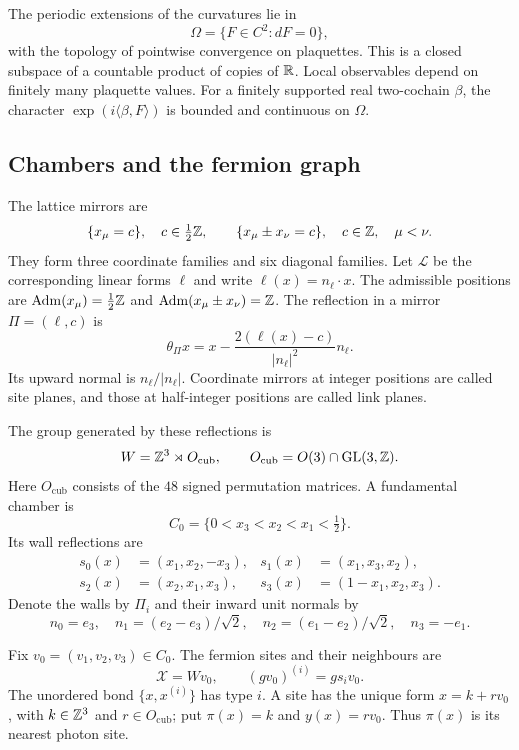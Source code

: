 The periodic extensions of the curvatures lie in
\[
 \Omega=\{F\in C^2:dF=0\},
\]
with the topology of pointwise convergence on plaquettes. This is a
closed subspace of a countable product of copies of $\mathbb R$. Local
observables depend on finitely many plaquette values. For a finitely
supported real two-cochain $\beta$, the character
$\exp(i\langle\beta,F\rangle)$ is bounded and continuous on $\Omega$.

\subsection{Chambers and the fermion graph}\label{subsec:reg-chambers}

The lattice mirrors are
\begin{equation}\label{eq:reg-mirrors}
 \{x_\mu=c\},\quad c\in\tfrac12\mathbb Z,
 \qquad
 \{x_\mu\pm x_\nu=c\},\quad c\in\mathbb Z,\quad\mu<\nu.
\end{equation}
They form three coordinate families and six diagonal families. Let
$\mathcal L$ be the corresponding linear forms $\ell$ and write
$\ell(x)=n_\ell\cdot x$. The admissible positions are
$\operatorname{Adm}(x_\mu)=\frac12\mathbb Z$ and
$\operatorname{Adm}(x_\mu\pm x_\nu)=\mathbb Z$. The reflection in a mirror
$\Pi=(\ell,c)$ is
\begin{equation}\label{eq:reg-reflection}
 \theta_\Pi x=x-\frac{2(\ell(x)-c)}{|n_\ell|^2}n_\ell.
\end{equation}
Its upward normal is $n_\ell/|n_\ell|$. Coordinate mirrors at integer
positions are called site planes, and those at half-integer positions
are called link planes.

The group generated by these reflections is
\[
 W=\mathbb Z^3\rtimes O_{\mathrm{cub}},
 \qquad O_{\mathrm{cub}}=O(3)\cap\operatorname{GL}(3,\mathbb Z).
\]
Here $O_{\mathrm{cub}}$ consists of the $48$ signed permutation matrices.
A fundamental chamber is
\[
 C_0=\{0<x_3<x_2<x_1<\tfrac12\}.
\]
Its wall reflections are
\begin{align*}
 s_0(x)&=(x_1,x_2,-x_3),&
 s_1(x)&=(x_1,x_3,x_2),\\
 s_2(x)&=(x_2,x_1,x_3),&
 s_3(x)&=(1-x_1,x_2,x_3).
\end{align*}
Denote the walls by $\Pi_i$ and their inward unit normals by
\begin{equation}\label{eq:reg-wall-normals}
 n_0=e_3,\quad n_1=(e_2-e_3)/\sqrt2,
 \quad n_2=(e_1-e_2)/\sqrt2,\quad n_3=-e_1.
\end{equation}

Fix $v_0=(v_1,v_2,v_3)\in C_0$. The fermion sites and their neighbours
are
\begin{equation}\label{eq:reg-fermion-sites}
 \mathcal X=Wv_0,\qquad (gv_0)^{(i)}=gs_iv_0.
\end{equation}
The unordered bond $\{x,x^{(i)}\}$ has type $i$. A site has the unique
form $x=k+rv_0$, with $k\in\mathbb Z^3$ and $r\in O_{\mathrm{cub}}$; put
$\pi(x)=k$ and $y(x)=rv_0$. Thus $\pi(x)$ is its nearest photon site.

